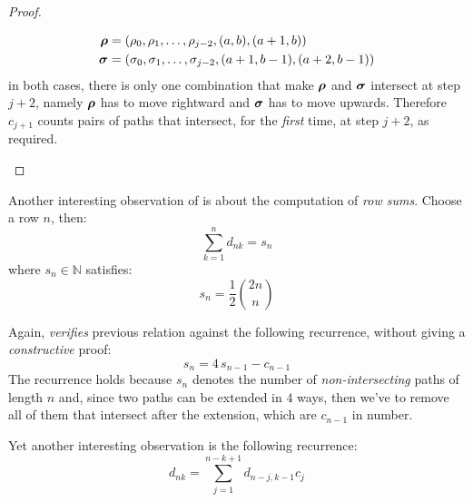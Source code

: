 \begin{proof}
\begin{itemize}
\begin{displaymath}
                \begin{split}
                    \boldsymbol{\rho}&=(\rho_{0},\rho_{1},\ldots,\rho_{j-2},(a, b),(a+1, b))\\
                    \boldsymbol{\sigma}&=(\sigma_{0},\sigma_{1},\ldots,\sigma_{j-2},(a+1,b-1),(a+2, b-1))
                \end{split}
            \end{displaymath}
            in both cases, there is only one combination that make $\boldsymbol{\rho}$ and $\boldsymbol{\sigma}$
            intersect at step $j+2$, namely $\boldsymbol{\rho}$ has to move rightward and $\boldsymbol{\sigma}$
            has to move upwards. Therefore $c_{j+1}$ counts pairs of paths that intersect,
            for the \emph{first} time, at step $j+2$, as required.
            
                 
    \end{itemize}
\end{proof}

Another interesting observation of \citeauthor{shapiro:1976} is about the computation
of \emph{row sums}. Choose a row $n$, then: 
\begin{displaymath}
    \sum_{k=1}^{n}{d_{nk}}=s_{n}
\end{displaymath}
where $s_{n}\in\mathbb{N}$ satisfies:
\begin{displaymath}
    s_{n}=\frac{1}{2}{{2n}\choose{n}}
\end{displaymath}

Again, \citeauthor{shapiro:1976} \emph{verifies} previous relation against the
following recurrence, without giving a \emph{constructive} proof:
\begin{displaymath}
    s_{n}=4\,s_{n-1}-c_{n-1}
\end{displaymath}
The recurrence holds because $s_{n}$ denotes the number of
\emph{non-intersecting} paths of length $n$ and, since two paths can be
extended in $4$ ways, then we've to remove all of them that intersect after the
extension, which are $c_{n-1}$ in number.

Yet another interesting observation is the following recurrence:
\begin{displaymath}
    d_{nk}=\sum_{j=1}^{n-k+1}{d_{n-j,k-1}c_{j}}
\end{displaymath}

